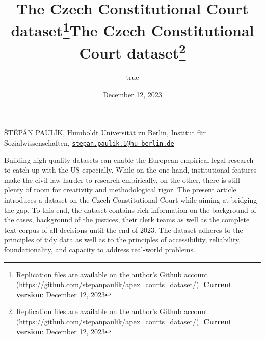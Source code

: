 \documentclass[
  11pt,
]{article}
\title{The Czech Constitutional Court dataset\thanks{Replication files
are available on the author's Github account
(\url{https://github.com/stepanpaulik/apex_courts_dataset/}).
\textbf{Current version}: December 12, 2023}}
\author{true}
\date{December 12, 2023}
\title{The Czech Constitutional Court dataset\thanks{Replication files
are available on the author's Github account
(\url{https://github.com/stepanpaulik/apex_courts_dataset/}).
\textbf{Current version}: December 12, 2023}  }
\date{}
\renewenvironment{abstract}
 {{%
    \setlength{\leftmargin}{0mm}
    \setlength{\rightmargin}{\leftmargin}%
  }%
  \relax}
 {\endlist}
\begin{document}



{%
\setlength{\parindent}{0pt}
\thispagestyle{plain}
{%
\maketitle  %

}




{
   \vskip 13.5pt\relax \normalsize\fontsize{11}{12}
   \MakeUppercase{Štěpán Paulík}, \small{Humboldt Universität zu Berlin,
Institut für Sozialwissenschaften,
\href{mailto:stepan.paulik.1@hu-berlin.de}{\nolinkurl{stepan.paulik.1@hu-berlin.de}}}   

}

}








\begin{abstract}


    \vskip 8.5pt %

\noindent \small{Building high quality datasets can enable the European
empirical legal research to catch up with the US especially. While on
the one hand, institutional features make the civil law harder to
research empirically, on the other, there is still plenty of room for
creativity and methodological rigor. The present article introduces a
dataset on the Czech Constitutional Court while aiming at bridging the
gap. To this end, the dataset contains rich information on the
background of the cases, background of the justices, their clerk teams
as well as the complete text corpus of all decisions until the end of
2023. The dataset adheres to the principles of tidy data as well as to
the principles of accessibility, reliability, foundationality, and
capacity to address real-world problems.}




\end{abstract}
\end{document}
